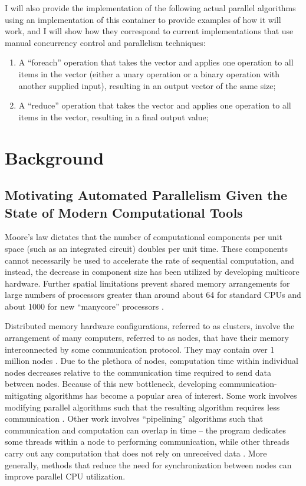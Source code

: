 \documentclass[pageno]{jpaper}
\begin{document}
I will also provide the implementation of the following actual parallel
algorithms using an implementation of this container to provide examples
of how it will work, and I will show how they correspond to current
implementations that use manual concurrency control and parallelism techniques:
\begin{enumerate}
    \item A ``foreach'' operation that takes the vector and applies one
        operation to all items in the vector (either a unary operation or a
        binary operation with another supplied input), resulting in an output
        vector of the same size;
    \item A ``reduce'' operation that takes the vector and applies one operation
        to all items in the vector, resulting in a final output value;
\end{enumerate}

\section{Background}

\subsection{Motivating Automated Parallelism Given the State of Modern
Computational Tools}
Moore's law dictates that the number of computational components per unit space
(such as an integrated circuit) doubles per unit time.  These
components cannot necessarily be used to accelerate the rate of sequential
computation, and instead, the decrease in component size has been utilized by
developing multicore hardware. Further spatial limitations prevent shared memory
arrangements for large numbers of processors greater than around about 64 for
standard CPUs and about 1000 for new ``manycore'' processors \cite{manycore}.

Distributed memory hardware configurations, referred to as clusters, involve the
arrangement of many computers, referred to as nodes, that have their memory
interconnected by some communication protocol. They may contain over 1 million
nodes \cite{top500}. Due to the plethora of nodes, computation time within
individual nodes decreases relative to the communication time required to send
data between nodes. Because of this new bottleneck, developing
communication-mitigating algorithms has become a popular area of interest. Some
work involves modifying parallel algorithms such that the resulting algorithm
requires less communication \cite{strassen_comm_opt}. Other work involves
``pipelining'' algorithms such that communication and computation can overlap in
time -- the program dedicates some threads within a node to performing
communication, while other threads carry out any computation that does not rely
on unreceived data \cite{gmres_pipe}.  More generally, methods that reduce the
need for synchronization between nodes can improve parallel CPU utilization.
\end{document}
